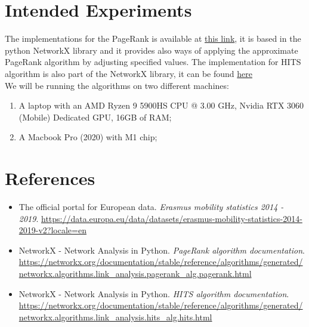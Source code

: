 \section{Intended Experiments}
    The implementations for the PageRank is available at \href{https://networkx.org/documentation/stable/reference/algorithms/generated/networkx.algorithms.link_analysis.pagerank_alg.pagerank.html}{\color{blue}this link}, 
    it is based in the python NetworkX library and it provides also ways of applying the approximate PageRank algorithm by adjusting specified values. 
    The implementation for HITS algorithm is also part of the NetworkX library, it can be found \href{https://networkx.org/documentation/stable/reference/algorithms/generated/networkx.algorithms.link_analysis.hits_alg.hits.html}{\color{blue}here}
    \\
    We will be running the algorithms on two different machines:
    \begin{enumerate}
        \item A laptop with an AMD Ryzen 9 5900HS CPU @ 3.00 GHz, Nvidia RTX 3060 (Mobile) Dedicated GPU, 16GB of RAM;
        \item A Macbook Pro (2020) with M1 chip;
    \end{enumerate}
\section{References}
    \begin{itemize}
        \item The official portal for European data. \textit{Erasmus mobility statistics 2014 - 2019}. \url{https://data.europa.eu/data/datasets/erasmus-mobility-statistics-2014-2019-v2?locale=en} 
        \item NetworkX - Network Analysis in Python. \textit{PageRank algorithm documentation}. \url{https://networkx.org/documentation/stable/reference/algorithms/generated/networkx.algorithms.link_analysis.pagerank_alg.pagerank.html}
        \item NetworkX - Network Analysis in Python. \textit{HITS algorithm documentation}. \url{https://networkx.org/documentation/stable/reference/algorithms/generated/networkx.algorithms.link_analysis.hits_alg.hits.html}
    \end{itemize}
